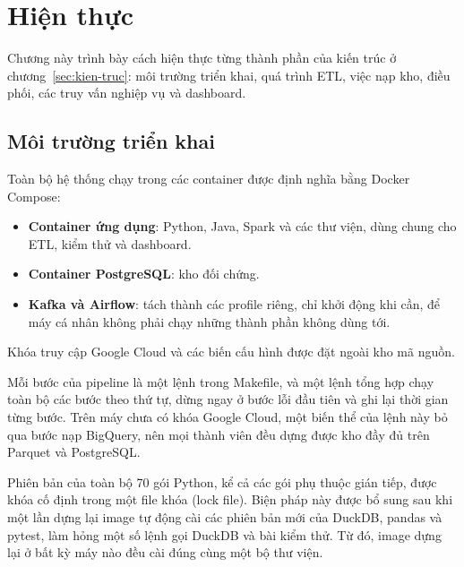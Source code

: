 \section{Hiện thực}
\label{sec:hien-thuc}

Chương này trình bày cách hiện thực từng thành phần của kiến trúc ở chương~\ref{sec:kien-truc}: môi trường triển khai, quá trình ETL, việc nạp kho, điều phối,
các truy vấn nghiệp vụ và dashboard.

\subsection{Môi trường triển khai}
\label{sec:moi-truong}

Toàn bộ hệ thống chạy trong các container được định nghĩa bằng Docker Compose:
\begin{itemize}
  \item \textbf{Container ứng dụng}: Python, Java, Spark và các thư viện, dùng chung cho ETL, kiểm thử và dashboard.
  \item \textbf{Container PostgreSQL}: kho đối chứng.
  \item \textbf{Kafka và Airflow}: tách thành các profile riêng, chỉ khởi động khi cần, để máy cá nhân không phải chạy những thành phần không dùng tới.
\end{itemize}

Khóa truy cập Google Cloud và các biến cấu hình được đặt ngoài kho mã nguồn.

Mỗi bước của pipeline là một lệnh trong Makefile, và một lệnh tổng hợp chạy toàn bộ các bước
theo thứ tự, dừng ngay ở bước lỗi đầu tiên và ghi lại thời gian từng bước. Trên máy chưa có
khóa Google Cloud, một biến thể của lệnh này bỏ qua bước nạp BigQuery, nên mọi thành viên
đều dựng được kho đầy đủ trên Parquet và PostgreSQL.

Phiên bản của toàn bộ 70 gói Python, kể cả các gói phụ thuộc gián tiếp, được khóa cố định
trong một file khóa (lock file). Biện pháp này được bổ sung sau khi một lần dựng lại image tự
động cài các phiên bản mới của DuckDB, pandas và pytest, làm hỏng một số lệnh gọi DuckDB và
bài kiểm thử. Từ đó, image dựng lại ở bất kỳ máy nào đều cài đúng cùng một bộ thư viện.

